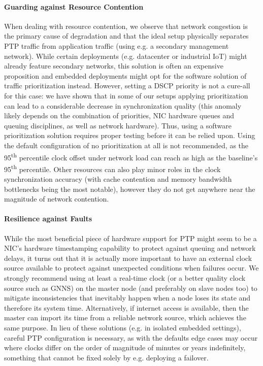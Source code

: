 \paragraph{Guarding against Resource Contention}
When dealing with resource contention, we observe that network congestion is the primary cause of degradation and that the ideal setup physically separates PTP traffic from application traffic (using e.g. a secondary management network). While certain deployments (e.g. datacenter or industrial IoT) might already feature secondary networks, this solution is often an expensive proposition and embedded deployments might opt for the software solution of traffic prioritization instead. However, setting a DSCP priority is not a cure-all for this case: we have shown that in some of our setups applying prioritization can lead to a considerable decrease in synchronization quality (this anomaly likely depends on the combination of priorities, NIC hardware queues and queuing disciplines, as well as network hardware). Thus, using a software prioritization solution requires proper testing before it can be relied upon. Using the default configuration of no prioritization at all is not recommended, as the 95\textsuperscript{th} percentile clock offset under network load can reach as high as \fRatio[-2]{\cmpMax} the baseline's 95\textsuperscript{th} percentile. Other resources can also play minor roles in the clock synchronization accuracy (with cache contention and memory bandwidth bottlenecks being the most notable), however they do not get anywhere near the magnitude of network contention.

\paragraph{Resilience against Faults} While the most beneficial piece of hardware support for PTP might seem to be a NIC's hardware timestamping capability to protect against queuing and network delays, it turns out that it is actually more important to have an external clock source available to protect against unexpected conditions when failures occur. We strongly recommend using at least a real-time clock (or a better quality clock source such as GNNS) on the master node (and preferably on slave nodes too) to mitigate inconsistencies that inevitably happen when a node loses its state and therefore its system time. Alternatively, if internet access is available, then the master can import its time from a reliable network source, which achieves the same purpose. In lieu of these solutions (e.g. in isolated embedded settings), careful PTP configuration is necessary, as with the defaults edge cases may occur where clocks differ on the order of magnitude of minutes or years indefinitely, something that cannot be fixed solely by e.g. deploying a failover.

